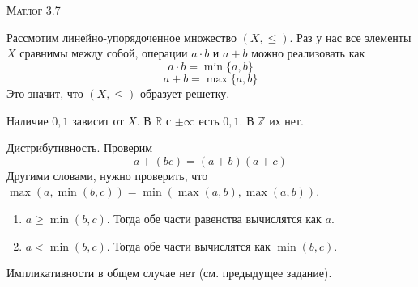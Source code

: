 \documentclass[10pt]{article}
\begin{document}
\def\chap#1#2{\ \\ {\large\bf#1 \ | \ \tt\scshape#2} \par}

\ \vspace{-1cm}

{\bf
\ \\
\Large\centerline{\scshape Матлог 3.7}
}\normalsize

Рассмотим линейно-упорядоченное множество $(X, \leqslant)$.
Раз у нас все элементы $X$ сравнимы между собой, операции $a\cdot b$ и $a+b$ можно реализовать как
\[ a\cdot b = \min \{ a,b\} \]
\[ a+b = \max\{ a,b \} \] 
Это значит, что $(X, \leqslant)$ образует решетку.


Наличие $0,1$ зависит от $X$.
В $\mathbb{R}$ с $\pm \infty$ есть $0,1$.
В $\mathbb{Z}$ их нет.

Дистрибутивность.
Проверим \[ a+(bc) = (a+b)(a+c) \]
Другими словами, нужно проверить, что $\max (a, \min (b,c)) = \min (\max(a,b), \max(a,b))$.

\begin{enumerate}
    \item $a \geqslant \min(b,c)$. Тогда обе части равенства вычислятся как $a$.
    \item $a < \min(b,c)$. Тогда обе части вычислятся как $\min(b,c)$.
\end{enumerate}

Импликативности в общем случае нет (см. предыдущее задание). 
\end{document}
